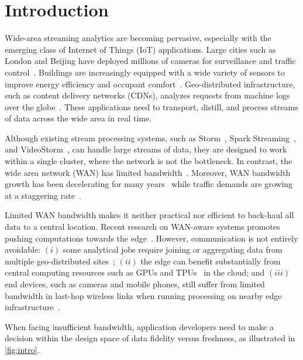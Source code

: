 \section{Introduction}

Wide-area streaming analytics are becoming pervasive, especially with the
emerging class of Internet of Things (IoT) applications.  Large cities such as
London and Beijing have deployed millions of cameras for surveillance and
traffic control~\cite{skynet, london.surveillance}. Buildings are increasingly
equipped with a wide variety of sensors to improve energy efficiency and
occupant comfort~\cite{krioukov2012building}. Geo-distributed infrastructure,
such as content delivery networks (CDNs), analyzes requests from machine logs
over the globe~\cite{mukerjee2015practical}. These applications need to
transport, distill, and process streams of data across the wide area in real
time.

Although existing stream processing systems, such as
Storm~\cite{toshniwal2014storm}, Spark Streaming~\cite{zaharia2013discretized},
and VideoStorm~\cite{zhang2017live}, can handle large streams of data, they are
designed to work within a single cluster, where the network is not the
bottleneck.  In contrast, the wide area network (WAN) has limited
bandwidth~\cite{hsieh17gaia, vulimiri2015global}.  Moreover, WAN bandwidth
growth has been decelerating for many years~\cite{global2016telegeography} while
traffic demands are growing at a staggering rate~\cite{index2013zettabyte}.

Limited WAN bandwidth makes it neither practical nor efficient to back-haul all
data to a central location.  Recent research on WAN-aware systems promotes
pushing computations towards the edge~\cite{rabkin2014aggregation,
  satyanarayanan2009case}. However, communication is not entirely avoidable:
$(i)$ some analytical jobs require joining or aggregating data from multiple
geo-distributed sites~\cite{pu2015low, viswanathan2016clarinet}; $(ii)$ the edge
can benefit substantially from central computing resources such as GPUs and
TPUs~\cite{abadi2016tensorflow} in the cloud; and $(iii)$ end devices, such as
cameras and mobile phones, still suffer from limited bandwidth in last-hop
wireless links when running processing on nearby edge
infrastructure~\cite{abari2017enabling, zhang2015design}.

When facing insufficient bandwidth, application developers need to make a
decision within the design space of data fidelity versus freshness, as
illustrated in \autoref{fig:intro}.

